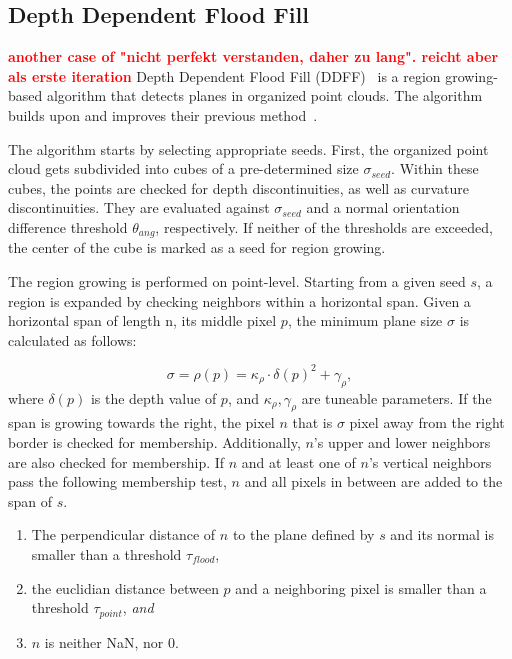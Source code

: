 \documentclass[main.tex]{subfiles}
\begin{document}
\subsection{Depth Dependent Flood Fill}
\textbf{\textcolor{red}{another case of "nicht perfekt verstanden, daher zu lang". reicht aber als erste iteration}}
Depth Dependent Flood Fill (DDFF)~\cite{Roychoudhury_Missura_Bennewitz_2021_new} is a region growing-based algorithm that detects planes in organized point clouds.
The algorithm builds upon and improves their previous method~\cite{Roychoudhury_Missura_Bennewitz_2021_old}.

The algorithm starts by selecting appropriate seeds. First, the organized point cloud gets subdivided into cubes of a
pre-determined size $\sigma_{seed}$. Within these cubes, the points are checked for depth discontinuities, as well as
curvature discontinuities. They are evaluated against $\sigma_{seed}$ and a normal orientation difference
threshold $\theta_{ang}$, respectively. If neither of the thresholds are exceeded, the center of the cube is marked as
a seed for region growing.

The region growing is performed on point-level. Starting from a given seed $s$, a region is expanded by checking
neighbors within a horizontal span.
Given a horizontal span of length n, its middle pixel $p$, the minimum plane size $\sigma$ is calculated as follows:

\begin{equation}
    \sigma = \rho(p) = \kappa_\rho \cdot \delta(p)^2 + \gamma_\rho,
\end{equation}
where $\delta(p)$ is the depth value of $p$, and $\kappa_\rho, \gamma_\rho$ are tuneable parameters.
If the span is growing towards the right, the pixel $n$ that is $\sigma$ pixel away from the right border is checked
for membership. Additionally, $n$'s upper and lower neighbors are also checked for membership. If $n$ and at least one
of $n$'s vertical neighbors pass the following membership test, $n$ and all pixels in between are added to the span of $s$.

\begin{enumerate}
    \item The perpendicular distance of $n$ to the plane defined by $s$ and its normal is smaller than
          a threshold $\tau_{flood}$,
    \item the euclidian distance between $p$ and a neighboring pixel is smaller than a threshold
          $\tau_{point}$, \textit{and}
    \item $n$ is neither NaN, nor 0.
\end{enumerate}
\end{document}
